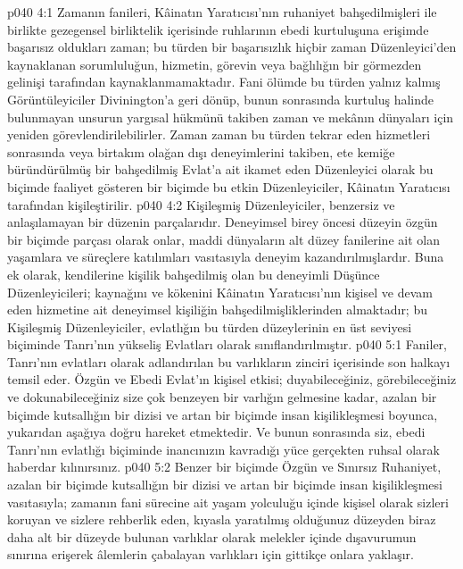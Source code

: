 \vs p040 4:1 Zamanın fanileri, Kâinatın Yaratıcısı’nın ruhaniyet bahşedilmişleri ile birlikte gezegensel birliktelik içerisinde ruhlarının ebedi kurtuluşuna erişimde başarısız oldukları zaman; bu türden bir başarısızlık hiçbir zaman Düzenleyici’den kaynaklanan sorumluluğun, hizmetin, görevin veya bağlılığın bir görmezden gelinişi tarafından kaynaklanmamaktadır. Fani ölümde bu türden yalnız kalmış Görüntüleyiciler Divinington’a geri dönüp, bunun sonrasında kurtuluş halinde bulunmayan unsurun yargısal hükmünü takiben zaman ve mekânın dünyaları için yeniden görevlendirilebilirler. Zaman zaman bu türden tekrar eden hizmetleri sonrasında veya birtakım olağan dışı deneyimlerini takiben, ete kemiğe büründürülmüş bir bahşedilmiş Evlat’a ait ikamet eden Düzenleyici olarak bu biçimde faaliyet gösteren bir biçimde bu etkin Düzenleyiciler, Kâinatın Yaratıcısı tarafından kişileştirilir.
\vs p040 4:2 Kişileşmiş Düzenleyiciler, benzersiz ve anlaşılamayan bir düzenin parçalarıdır. Deneyimsel birey öncesi düzeyin özgün bir biçimde parçası olarak onlar, maddi dünyaların alt düzey fanilerine ait olan yaşamlara ve süreçlere katılımları vasıtasıyla deneyim kazandırılmışlardır. Buna ek olarak, kendilerine kişilik bahşedilmiş olan bu deneyimli Düşünce Düzenleyicileri; kaynağını ve kökenini Kâinatın Yaratıcısı’nın kişisel ve devam eden hizmetine ait deneyimsel kişiliğin bahşedilmişliklerinden almaktadır; bu Kişileşmiş Düzenleyiciler, evlatlığın bu türden düzeylerinin en üst seviyesi biçiminde Tanrı’nın yükseliş Evlatları olarak sınıflandırılmıştır.
\vs p040 5:1 Faniler, Tanrı’nın evlatları olarak adlandırılan bu varlıkların zinciri içerisinde son halkayı temsil eder. Özgün ve Ebedi Evlat’ın kişisel etkisi; duyabileceğiniz, görebileceğiniz ve dokunabileceğiniz size çok benzeyen bir varlığın gelmesine kadar, azalan bir biçimde kutsallığın bir dizisi ve artan bir biçimde insan kişilikleşmesi boyunca, yukarıdan aşağıya doğru hareket etmektedir. Ve bunun sonrasında siz, ebedi Tanrı’nın evlatlığı biçiminde inancınızın kavradığı yüce gerçekten ruhsal olarak haberdar kılınırsınız.
\vs p040 5:2 Benzer bir biçimde Özgün ve Sınırsız Ruhaniyet, azalan bir biçimde kutsallığın bir dizisi ve artan bir biçimde insan kişilikleşmesi vasıtasıyla; zamanın fani sürecine ait yaşam yolculuğu içinde kişisel olarak sizleri koruyan ve sizlere rehberlik eden, kıyasla yaratılmış olduğunuz düzeyden biraz daha alt bir düzeyde bulunan varlıklar olarak melekler içinde dışavurumun sınırına erişerek âlemlerin çabalayan varlıkları için gittikçe onlara yaklaşır.
